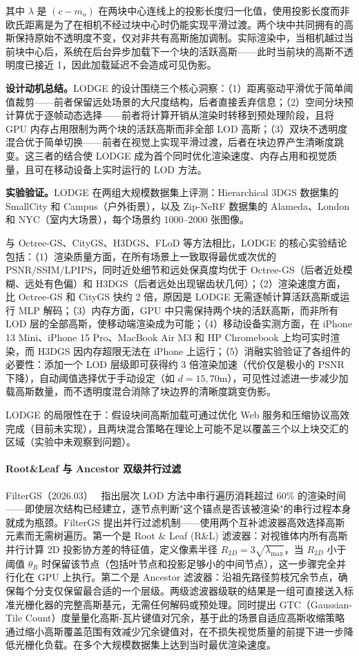 其中 $\lambda$ 是 $(c - m_o)$ 在两块中心连线上的投影长度归一化值，使用投影长度而非欧氏距离是为了在相机不经过块中心时仍能实现平滑过渡。两个块中共同拥有的高斯保持原始不透明度不变，仅对非共有高斯施加调制。实际渲染中，当相机越过当前块中心后，系统在后台异步加载下一个块的活跃高斯——此时当前块的高斯不透明度已接近 1，因此加载延迟不会造成可见伪影。

\textbf{设计动机总结。}LODGE 的设计围绕三个核心洞察：（1）距离驱动平滑优于简单阈值裁剪——前者保留远处场景的大尺度结构，后者直接丢弃信息；（2）空间分块预计算优于逐帧动态选择——前者将计算开销从渲染时转移到预处理阶段，且将 GPU 内存占用限制为两个块的活跃高斯而非全部 LOD 高斯；（3）双块不透明度混合优于简单切换——前者在视觉上实现平滑过渡，后者在块边界产生清晰度跳变。这三者的结合使 LODGE 成为首个同时优化渲染速度、内存占用和视觉质量，且可在移动设备上实时运行的 LOD 方法。

\textbf{实验验证。}LODGE 在两组大规模数据集上评测：Hierarchical 3DGS 数据集的 SmallCity 和 Campus（户外街景），以及 Zip-NeRF 数据集的 Alameda、London 和 NYC（室内大场景），每个场景约 1000--2000 张图像。

与 Octree-GS、CityGS、H3DGS、FLoD 等方法相比，LODGE 的核心实验结论包括：（1）渲染质量方面，在所有场景上一致取得最优或次优的 PSNR/SSIM/LPIPS，同时近处细节和远处保真度均优于 Octree-GS（后者近处模糊、远处有色偏）和 H3DGS（后者远处出现锯齿状几何）；（2）渲染速度方面，比 Octree-GS 和 CityGS 快约 2 倍，原因是 LODGE 无需逐帧计算活跃高斯或运行 MLP 解码；（3）内存方面，GPU 中只需保持两个块的活跃高斯，而非所有 LOD 层的全部高斯，使移动端渲染成为可能；（4）移动设备实测方面，在 iPhone 13 Mini、iPhone 15 Pro、MacBook Air M3 和 HP Chromebook 上均可实时渲染，而 H3DGS 因内存超限无法在 iPhone 上运行；（5）消融实验验证了各组件的必要性：添加一个 LOD 层级即可获得约 3 倍渲染加速（代价仅是极小的 PSNR 下降），自动阈值选择优于手动设定（如 $d = 15, 70$m），可见性过滤进一步减少加载高斯数量，而不透明度混合消除了块边界的清晰度跳变伪影。

LODGE 的局限性在于：假设块间高斯加载可通过优化 Web 服务和压缩协议高效完成（目前未实现），且两块混合策略在理论上可能不足以覆盖三个以上块交汇的区域（实验中未观察到问题）。

\paragraph{Root\&Leaf 与 Ancestor 双级并行过滤}

FilterGS（2026.03）~\cite{2603_23891} 指出层次 LOD 方法中串行遍历消耗超过 60\% 的渲染时间——即使层次结构已经建立，逐节点判断"这个锚点是否该被渲染"的串行过程本身就成为瓶颈。FilterGS 提出并行过滤机制——使用两个互补滤波器高效选择高斯元素而无需树遍历。第一个是 Root \& Leaf (R\&L) 滤波器：对视锥体内所有高斯并行计算 2D 投影协方差的特征值，定义像素半径 $R_{2D} = 3\sqrt{\lambda_{\max}}$，当 $R_{2D}$ 小于阈值 $\theta_R$ 时保留该节点（包括叶节点和投影足够小的中间节点），这一步骤完全并行化在 GPU 上执行。第二个是 Ancestor 滤波器：沿祖先路径剪枝冗余节点，确保每个分支仅保留最合适的一个层级。两级滤波器级联的结果是一组可直接送入标准光栅化器的完整高斯基元，无需任何解码或预处理。同时提出 GTC（Gaussian-Tile Count）度量量化高斯-瓦片键值对冗余，基于此的场景自适应高斯收缩策略通过缩小高斯覆盖范围有效减少冗余键值对，在不损失视觉质量的前提下进一步降低光栅化负载。在多个大规模数据集上达到当时最优渲染速度。

